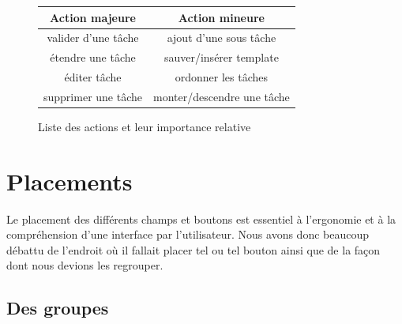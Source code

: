\documentclass[11pt]{article}
\begin{document}
\begin{figure}[h]
  \centering
  
  \begin{tabular}[h!]{c|c}
    Action majeure & Action mineure\\
    \hline
    valider d'une tâche & ajout d'une sous tâche\\
    étendre une tâche & sauver/insérer template\\
    éditer tâche & ordonner les tâches\\
    supprimer une tâche & monter/descendre une tâche\\
  \end{tabular}
  
  \caption{Liste des actions et leur importance relative}
  \label{fig:actionlist}
\end{figure}





\section{Placements}

Le placement des différents champs et boutons est essentiel à
l'ergonomie et à la compréhension d'une interface par
l'utilisateur. Nous avons donc beaucoup débattu de l'endroit où il
fallait placer tel ou tel bouton ainsi que de la façon dont nous
devions les regrouper.



\subsection{Des groupes}
\end{document}
